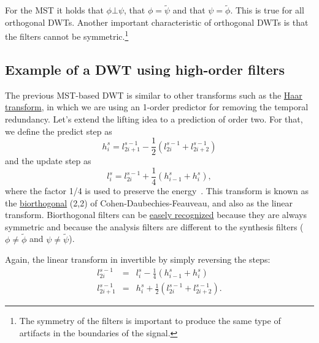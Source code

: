 For the MST it holds that $\phi\bot\psi$, that $\phi=\tilde\psi$ and
that $\psi=\tilde\phi$. This is true for all orthogonal DWTs. Another
important characteristic of orthogonal DWTs is that the filters cannot
be symmetric.\footnote{The symmetry of the filters is important to
  produce the same type of artifacts in the boundaries of the signal.}


\subsection{Example of a DWT using high-order filters}
The previous MST-based DWT is similar to other transforms such as the
\href{https://en.wikipedia.org/wiki/Haar_wavelet}{Haar transform}, in
which we are using an 1-order predictor for removing the temporal
redundancy. Let's extend the lifting idea to a prediction of order
two. For that, we define the predict step as
\begin{equation}
  h^s_i = l^{s-1}_{2i+1} - \frac{1}{2}(l^{s-1}_{2i} + l^{s-1}_{2i+2})
\end{equation}
and the update step as
\begin{equation}
  l^s_i = l^{s-1}_{2i} + \frac{1}{4}(h^s_{i-1} + h^s_i),
\end{equation}
where the factor 1/4 is used to preserve the
energy~\cite{sweldens1997building}. This transform is known as the
\href{https://en.wikipedia.org/wiki/Biorthogonal_wavelet}{biorthogonal}
(2,2) of Cohen-Daubechies-Feauveau, and also as the linear transform.
Biorthogonal filters can be \href{http://wavelets.pybytes.com/}{easely
  recognized} because they are always symmetric and because the
analysis filters are different to the synthesis filters
($\phi\ne\tilde{\phi}$ and $\psi\ne\tilde{\psi}$).

Again, the linear transform in invertible by simply reversing the
steps:
\begin{equation}
  \begin{array}{rcl}
    l^{s-1}_{2i} & = & l^s_i - \frac{1}{4}(h^s_{i-1} + h^s_i)\\
    l^{s-1}_{2i+1} & = & h^s_i + \frac{1}{2}(l^{s-1}_{2i} + l^{s-1}_{2i+2}).
  \end{array}
\end{equation}

